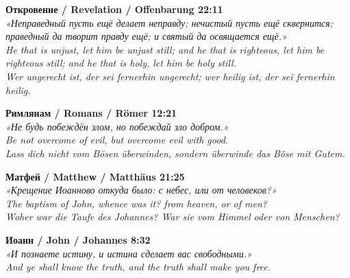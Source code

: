 \documentclass[11pt,a4paper]{article}
\theoremstyle{definition}
\theoremstyle{remark}
\begin{document}
\newpage


\begin{tcolorbox}[
  enhanced, breakable,
  colback=blue!4!white, colframe=titlecolor,
  title={\textbf{Biblical Anchors / Библейские якоря (RU | EN | DE)}},
  fonttitle=\bfseries, boxrule=1pt, arc=4pt
]

\textbf{Откровение / Revelation / Offenbarung 22:11}\\[0.2cm]
\foreignlanguage{russian}{\textit{«Неправедный пусть ещё делает неправду;
нечистый пусть ещё сквернится; праведный да творит правду ещё;
и святый да освящается ещё.»}}\\[0.1cm]
\textit{He that is unjust, let him be unjust still; and he that is righteous,
let him be righteous still; and he that is holy, let him be holy still.}\\[0.1cm]
\textit{Wer ungerecht ist, der sei fernerhin ungerecht; wer heilig ist,
der sei fernerhin heilig.}

\vspace{0.4cm}
\textbf{Римлянам / Romans / Römer 12:21}\\[0.2cm]
\foreignlanguage{russian}{\textit{«Не будь побеждён злом, но побеждай
зло добром.»}}\\[0.1cm]
\textit{Be not overcome of evil, but overcome evil with good.}\\[0.1cm]
\textit{Lass dich nicht vom Bösen überwinden, sondern überwinde das Böse mit Gutem.}

\vspace{0.4cm}
\textbf{Матфей / Matthew / Matthäus 21:25}\\[0.2cm]
\foreignlanguage{russian}{\textit{«Крещение Иоанново откуда было:
с небес, или от человеков?»}}\\[0.1cm]
\textit{The baptism of John, whence was it? from heaven, or of men?}\\[0.1cm]
\textit{Woher war die Taufe des Johannes? War sie vom Himmel oder von Menschen?}

\vspace{0.4cm}
\textbf{Иоанн / John / Johannes 8:32}\\[0.2cm]
\foreignlanguage{russian}{\textit{«И познаете истину,
и истина сделает вас свободными.»}}\\[0.1cm]
\textit{And ye shall know the truth,
and the truth shall make you free.}

\end{tcolorbox}
\end{document}
